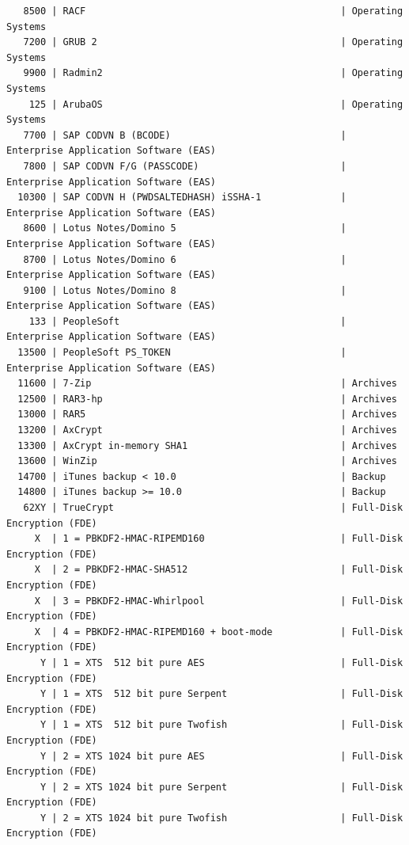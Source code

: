 \documentclass{article}
\begin{document}
\begin{lstlisting}
   8500 | RACF                                             | Operating Systems
   7200 | GRUB 2                                           | Operating Systems
   9900 | Radmin2                                          | Operating Systems
    125 | ArubaOS                                          | Operating Systems
   7700 | SAP CODVN B (BCODE)                              | Enterprise Application Software (EAS)
   7800 | SAP CODVN F/G (PASSCODE)                         | Enterprise Application Software (EAS)
  10300 | SAP CODVN H (PWDSALTEDHASH) iSSHA-1              | Enterprise Application Software (EAS)
   8600 | Lotus Notes/Domino 5                             | Enterprise Application Software (EAS)
   8700 | Lotus Notes/Domino 6                             | Enterprise Application Software (EAS)
   9100 | Lotus Notes/Domino 8                             | Enterprise Application Software (EAS)
    133 | PeopleSoft                                       | Enterprise Application Software (EAS)
  13500 | PeopleSoft PS_TOKEN                              | Enterprise Application Software (EAS)
  11600 | 7-Zip                                            | Archives
  12500 | RAR3-hp                                          | Archives
  13000 | RAR5                                             | Archives
  13200 | AxCrypt                                          | Archives
  13300 | AxCrypt in-memory SHA1                           | Archives
  13600 | WinZip                                           | Archives
  14700 | iTunes backup < 10.0                             | Backup
  14800 | iTunes backup >= 10.0                            | Backup
   62XY | TrueCrypt                                        | Full-Disk Encryption (FDE)
     X  | 1 = PBKDF2-HMAC-RIPEMD160                        | Full-Disk Encryption (FDE)
     X  | 2 = PBKDF2-HMAC-SHA512                           | Full-Disk Encryption (FDE)
     X  | 3 = PBKDF2-HMAC-Whirlpool                        | Full-Disk Encryption (FDE)
     X  | 4 = PBKDF2-HMAC-RIPEMD160 + boot-mode            | Full-Disk Encryption (FDE)
      Y | 1 = XTS  512 bit pure AES                        | Full-Disk Encryption (FDE)
      Y | 1 = XTS  512 bit pure Serpent                    | Full-Disk Encryption (FDE)
      Y | 1 = XTS  512 bit pure Twofish                    | Full-Disk Encryption (FDE)
      Y | 2 = XTS 1024 bit pure AES                        | Full-Disk Encryption (FDE)
      Y | 2 = XTS 1024 bit pure Serpent                    | Full-Disk Encryption (FDE)
      Y | 2 = XTS 1024 bit pure Twofish                    | Full-Disk Encryption (FDE)

\end{lstlisting}
\end{document}

